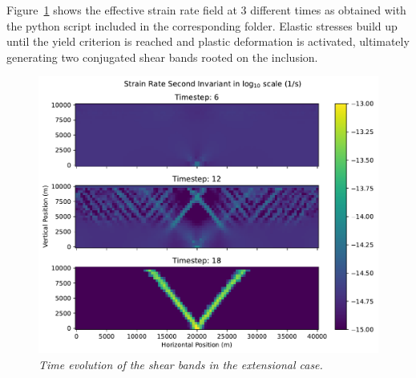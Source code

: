Figure~\ref{fig:kaus_brick_result} shows the effective strain rate field at 3 different times as obtained with the python script included in the corresponding folder. Elastic stresses build up until the yield criterion is reached and plastic deformation is activated, ultimately generating two conjugated shear bands rooted on the inclusion.

\begin{figure}[h]
\centering
\includegraphics[width=12cm]{../../benchmarks/viscoelastic_plastic_shear_bands/kaus_2010/doc/kaus10_vep.pdf}
\caption{\it Time evolution of the shear bands in the extensional case.}
\label{fig:kaus_brick_result}
\end{figure}
